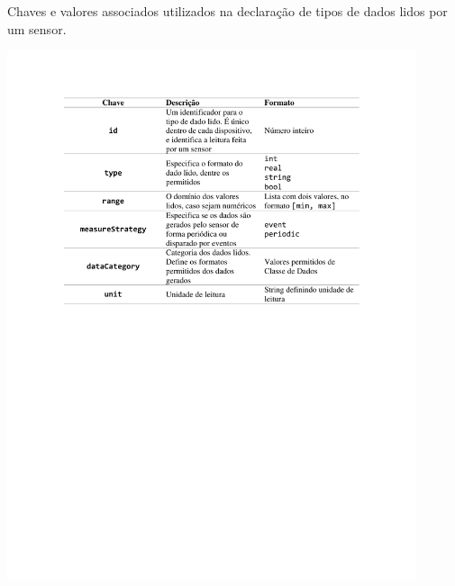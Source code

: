 \begin{table}[hp]
	\centering
	\caption{Chaves e valores associados utilizados na declaração de tipos de dados lidos por um sensor.}\smallskip
	\label{tab:datatype}
	\includegraphics[width=0.9\textwidth]{tabelas/datatype.pdf}
	
	\medskip
	

\end{table}
